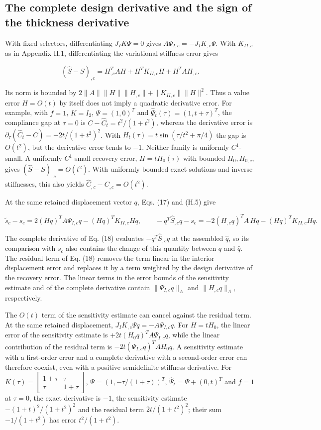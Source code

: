 \documentclass[preprint,12pt,authoryear]{elsarticle}
\begin{document}
\subsection{The complete design derivative and the sign of the thickness derivative}

With fixed selectors, differentiating \(J_IK\Psi=0\) gives \(A\Psi_{I,c}=-J_IK_{,c}\Psi\). With \(K_{II,c}\) as in Appendix H.1, differentiating the variational stiffness error gives

\[
\boxed{(\widehat S-S)_{,c}
=H_{,c}^TAH+H^TK_{II,c}H+H^TAH_{,c}.}
\tag{H.5}
\]

Its norm is bounded by \(2\|A\|\|H\|\|H_{,c}\|+\|K_{II,c}\|\|H\|^2\). Thus a value error \(H=O(t)\) by itself does not imply a quadratic derivative error. For example, with \(f=1\), \(K=I_2\), \(\Psi=(1,0)^T\) and \(\widehat\Psi_t(\tau)=(1,t+\tau)^T\), the compliance gap at \(\tau=0\) is \(C-\widehat C_t=t^2/(1+t^2)\), whereas the derivative error is \(\partial_\tau(\widehat C_t-C)=-2t/(1+t^2)^2\). With \(H_t(\tau)=t\sin(\tau/t^2+\pi/4)\) the gap is \(O(t^2)\), but the derivative error tends to \(-1\). Neither family is uniformly \(C^1\)-small. A uniformly \(C^1\)-small recovery error, \(H=tH_0(\tau)\) with bounded \(H_0,H_{0,c}\), gives \((\widehat S-S)_{,c}=O(t^2)\). With uniformly bounded exact solutions and inverse stiffnesses, this also yields \(\widehat C_{,c}-C_{,c}=O(t^2)\).

At the same retained displacement vector \(q\), Eqs. (17) and (H.5) give

\[
\widetilde s_c-s_c=2(Hq)^TA\Psi_{I,c}q-(Hq)^TK_{II,c}Hq,\qquad
-q^T\widehat S_{,c}q-s_c=-2(H_{,c}q)^TA\,Hq-(Hq)^TK_{II,c}Hq.
\tag{H.6}
\]

The complete derivative of Eq. (18) evaluates \(-q^T\widehat S_{,c}q\) at the assembled \(\widehat q\), so its comparison with \(s_c\) also contains the change of this quantity between \(q\) and \(\widehat q\). The residual term of Eq. (18) removes the term linear in the interior displacement error and replaces it by a term weighted by the design derivative of the recovery error. The linear terms in the error bounds of the sensitivity estimate and of the complete derivative contain \(\|\Psi_{I,c}q\|_A\) and \(\|H_{,c}q\|_A\), respectively.

The \(O(t)\) term of the sensitivity estimate can cancel against the residual term. At the same retained displacement, \(J_IK_{,c}\Psi q=-A\Psi_{I,c}q\). For \(H=tH_0\), the linear error of the sensitivity estimate is \(+2t(H_0q)^TA\Psi_{I,c}q\), while the linear contribution of the residual term is \(-2t(\Psi_{I,c}q)^TAH_0q\). A sensitivity estimate with a first-order error and a complete derivative with a second-order error can therefore coexist, even with a positive semidefinite stiffness derivative. For \(K(\tau)=\begin{bmatrix}1+\tau&\tau\\\tau&1+\tau\end{bmatrix}\), \(\Psi=(1,-\tau/(1+\tau))^T\), \(\widehat\Psi_t=\Psi+(0,t)^T\) and \(f=1\) at \(\tau=0\), the exact derivative is \(-1\), the sensitivity estimate \(-(1+t)^2/(1+t^2)^2\) and the residual term \(2t/(1+t^2)^2\); their sum \(-1/(1+t^2)\) has error \(t^2/(1+t^2)\).
\end{document}
